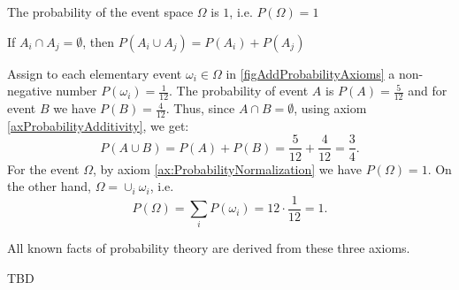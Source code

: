 \begin{axiom}[Normalization]
  \label{ax:ProbabilityNormalization}
  The probability of the event space $\Omega$ is $1$, i.e.
  $P\left(\Omega\right) = 1$
\end{axiom}

\begin{axiom}[Additivity]
\label{axProbabilityAdditivity}
If $A_i \cap A_j = \emptyset$, then 
$P\left(A_i \cup A_j\right) = P\left(A_i\right) + P\left(A_j\right)$
\end{axiom}

\begin{example}

Assign to each elementary event $\omega_i \in \Omega$
in \autoref{figAddProbabilityAxioms} a non-negative number 
$P\left(\omega_i\right) = \frac{1}{12}$. The probability of event $A$ is 
$P\left(A\right) = \frac{5}{12}$ and for event $B$ we have
$P\left(B\right) = \frac{4}{12}$. Thus, since 
$A \cap B = \emptyset$, using axiom
\ref{axProbabilityAdditivity}, we get:
\[
P\left(A\cup B\right) = 
P\left(A\right) + P\left(B\right) = 
\frac{5}{12} + \frac{4}{12} = \frac{3}{4}.
\]
For the event $\Omega$, by axiom \ref{ax:ProbabilityNormalization}
we have $P\left(\Omega\right) = 1$. On the other hand, 
$\Omega = \cup_i \omega_i$, i.e. 
\[
P\left(\Omega\right) = \sum_i P\left(\omega_i\right) =
12\cdot\frac{1}{12} = 1.
\]
\end{example}

All known facts of probability theory are derived from these three axioms.  



TBD